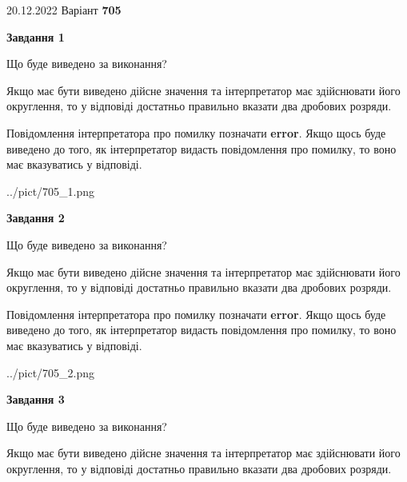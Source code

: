 \documentclass[12pt, ukrainian]{article}
\begin{document}
{20.12.2022 Варіант \No \textbf { 705 }\par}
{
\begin {Large}

{\begin {center}\textbf{Завдання 1}\end {center}}\par
Що буде виведено за виконання? \par

Якщо має бути виведено дійсне значення та інтерпретатор має здійснювати його округлення, 
то у відповіді достатньо правильно вказати два дробових розряди.

Повідомлення інтерпретатора про помилку позначати \textbf{error}.
Якщо щось буде виведено до того, як інтерпретатор видасть повідомлення про помилку, 
то воно має вказуватись у відповіді. \par

\begin{center}
	{../pict/705_1.png}
\end{center}
\newpage

{\begin {center}\textbf{Завдання 2}\end {center}}\par
Що буде виведено за виконання? \par

Якщо має бути виведено дійсне значення та інтерпретатор має здійснювати його округлення, 
то у відповіді достатньо правильно вказати два дробових розряди.

Повідомлення інтерпретатора про помилку позначати \textbf{error}.
Якщо щось буде виведено до того, як інтерпретатор видасть повідомлення про помилку, 
то воно має вказуватись у відповіді. \par

\begin{center}
	{../pict/705_2.png}
\end{center}
\newpage

{\begin {center}\textbf{Завдання 3}\end {center}}\par
Що буде виведено за виконання? \par

Якщо має бути виведено дійсне значення та інтерпретатор має здійснювати його округлення, 
то у відповіді достатньо правильно вказати два дробових розряди.


\end{Large}}
\end{document}

